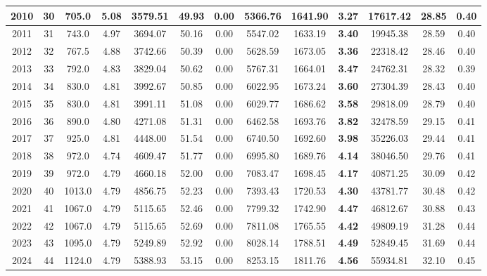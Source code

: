 {\begin{center}
\begin{tabular}[htb]{|c|c||c|c|c|c|c|c||c|c||c|c|c||}
\hline 
 2010 &  30 &  705.0 &  5.08 &  3579.51 &  49.93 &  0.00 &  5366.76 &  1641.90 &  {\bf 3.27} &  17617.42 &  28.85 &  0.40 \\ 
\hline 
 2011 &  31 &  743.0 &  4.97 &  3694.07 &  50.16 &  0.00 &  5547.02 &  1633.19 &  {\bf 3.40} &  19945.38 &  28.59 &  0.40 \\ 
\hline 
 2012 &  32 &  767.5 &  4.88 &  3742.66 &  50.39 &  0.00 &  5628.59 &  1673.05 &  {\bf 3.36} &  22318.42 &  28.46 &  0.40 \\ 
\hline 
 2013 &  33 &  792.0 &  4.83 &  3829.04 &  50.62 &  0.00 &  5767.31 &  1664.01 &  {\bf 3.47} &  24762.31 &  28.32 &  0.39 \\ 
\hline 
 2014 &  34 &  830.0 &  4.81 &  3992.67 &  50.85 &  0.00 &  6022.95 &  1673.24 &  {\bf 3.60} &  27304.39 &  28.43 &  0.40 \\ 
\hline 
 2015 &  35 &  830.0 &  4.81 &  3991.11 &  51.08 &  0.00 &  6029.77 &  1686.62 &  {\bf 3.58} &  29818.09 &  28.79 &  0.40 \\ 
\hline 
 2016 &  36 &  890.0 &  4.80 &  4271.08 &  51.31 &  0.00 &  6462.58 &  1693.76 &  {\bf 3.82} &  32478.59 &  29.15 &  0.41 \\ 
\hline 
 2017 &  37 &  925.0 &  4.81 &  4448.00 &  51.54 &  0.00 &  6740.50 &  1692.60 &  {\bf 3.98} &  35226.03 &  29.44 &  0.41 \\ 
\hline 
 2018 &  38 &  972.0 &  4.74 &  4609.47 &  51.77 &  0.00 &  6995.80 &  1689.76 &  {\bf 4.14} &  38046.50 &  29.76 &  0.41 \\ 
\hline 
 2019 &  39 &  972.0 &  4.79 &  4660.18 &  52.00 &  0.00 &  7083.47 &  1698.45 &  {\bf 4.17} &  40871.25 &  30.09 &  0.42 \\ 
\hline 
 2020 &  40 &  1013.0 &  4.79 &  4856.75 &  52.23 &  0.00 &  7393.43 &  1720.53 &  {\bf 4.30} &  43781.77 &  30.48 &  0.42 \\ 
\hline 
 2021 &  41 &  1067.0 &  4.79 &  5115.65 &  52.46 &  0.00 &  7799.32 &  1742.90 &  {\bf 4.47} &  46812.67 &  30.88 &  0.43 \\ 
\hline 
 2022 &  42 &  1067.0 &  4.79 &  5115.65 &  52.69 &  0.00 &  7811.08 &  1765.55 &  {\bf 4.42} &  49809.19 &  31.28 &  0.44 \\ 
\hline 
 2023 &  43 &  1095.0 &  4.79 &  5249.89 &  52.92 &  0.00 &  8028.14 &  1788.51 &  {\bf 4.49} &  52849.45 &  31.69 &  0.44 \\ 
\hline 
 2024 &  44 &  1124.0 &  4.79 &  5388.93 &  53.15 &  0.00 &  8253.15 &  1811.76 &  {\bf 4.56} &  55934.81 &  32.10 &  0.45 \\ 

\end{tabular}
\end{center}}
